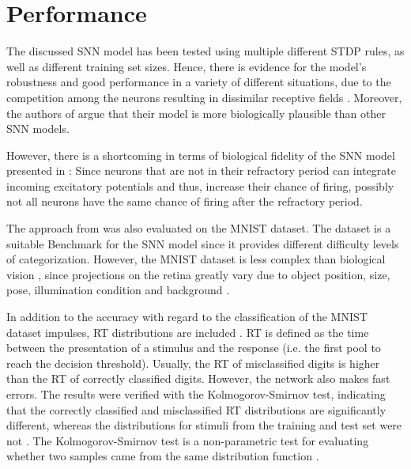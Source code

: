 \section{Performance}
\label{sec:result}

The discussed \ac{SNN} model has been tested using multiple different \ac{STDP} rules, as well as different training set sizes. 
Hence, there is evidence for the model's robustness and good performance in a variety of different situations, 
due to the competition among the neurons resulting in dissimilar receptive fields \cite{SNN}.
Moreover, the authors of \cite{SNN} argue that their model is more biologically plausible than other \ac{SNN} models.

However, there is a shortcoming in terms of biological fidelity of the \ac{SNN} model presented in \cite{SNN}:
Since neurons that are not in their refractory period can integrate incoming excitatory potentials and thus, 
increase their chance of firing, possibly not all neurons have the same chance of firing after the refractory period.

The approach from \cite{STDP_like} was also evaluated on the MNIST dataset.
The dataset is a suitable Benchmark for the \ac{SNN} model 
since it provides different difficulty levels of categorization.
However, the MNIST dataset is less complex than biological vision \cite{STDP_like}, 
since projections on the retina greatly vary due to object position, size, pose, illumination condition and background \cite{multi_scale_STDP}.

In addition to the accuracy with regard to the classification of the MNIST dataset impulses, \ac{RT} distributions are included \cite{STDP_like}.
\ac{RT} is defined as the time between the presentation of a stimulus and the response (i.e. the first pool to reach the decision threshold).
Usually, the \ac{RT} of misclassified digits is higher than the \ac{RT} of correctly classified digits.
However, the network also makes fast errors.
The results were verified with the Kolmogorov-Smirnov test, 
indicating that the correctly classified and misclassified \ac{RT} distributions are significantly different, 
whereas the distributions for stimuli from the training and test set were not \cite{STDP_like}.
The Kolmogorov-Smirnov test is a non-parametric test for evaluating whether two samples came from the same distribution function \cite{Kolmogorov_Smirnov}.


